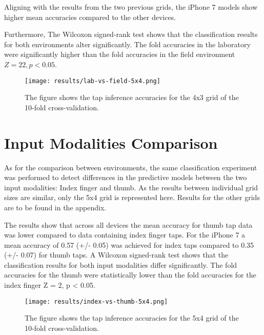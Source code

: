 Aligning with the results from the two previous grids, the iPhone 7 models show higher mean accuracies compared to the other devices. 

Furthermore, The Wilcoxon signed-rank test shows that the classification results for both environments alter significantly. The fold accuracies in the laboratory were significantly higher than the fold accuracies in the field environment $Z = 22, p < 0.05$.

\begin{figure}[h!]
  \centering
  \texttt{[image: results/lab-vs-field-5x4.png]}
  \caption{The figure shows the tap inference accuracies for the 4x3 grid of the 10-fold cross-validation.} \label{fig:participation}
\end{figure}

\section{Input Modalities Comparison}
As for the comparison between environments, the same classification experiment was performed to detect differences in the predictive models between the two input modalities: Index finger and thumb. As the results between individual grid sizes are similar, only the 5x4 grid is represented here. Results for the other grids are to be found in the appendix.

The results show that across all devices the mean accuracy for thumb tap data was lower compared to data containing index finger taps. For the iPhone 7 a mean accuracy of 0.57 (+/- 0.05) was achieved for index taps compared to 0.35 (+/- 0.07) for thumb taps. A Wilcoxon signed-rank test shows that the classification results for both input modalities differ significantly. The fold accuracies for the thumb were statistically lower than the fold accuracies for the index finger Z = 2, p < 0.05.


\begin{figure}[h!]
  \centering
  \texttt{[image: results/index-vs-thumb-5x4.png]}
  \caption{The figure shows the tap inference accuracies for the 5x4 grid of the 10-fold cross-validation.} \label{fig:participation}
\end{figure}

